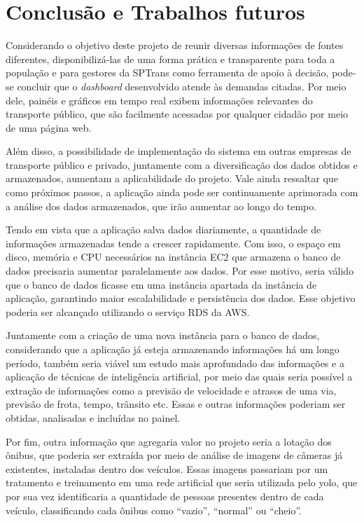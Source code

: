\chapter{Conclusão e Trabalhos futuros}
\label{Cap:Conclusoes}
\indent
\par Considerando o objetivo deste projeto de reunir diversas informações de fontes diferentes, disponibilizá-las de uma forma prática e transparente para toda a população e para gestores da SPTrans como ferramenta de apoio à decisão, pode-se concluir que o \textit{dashboard} desenvolvido atende às demandas citadas. Por meio dele, painéis e gráficos em tempo real exibem informações relevantes do transporte público, que são facilmente acessadas por qualquer cidadão por meio de uma página web.
\indent
\par Além disso, a possibilidade de implementação do sistema em outras empresas de transporte público e privado, juntamente com a diversificação dos dados obtidos e armazenados, aumentam a aplicabilidade do projeto. Vale ainda ressaltar que como próximos passos, a aplicação ainda pode ser continuamente aprimorada com a análise dos dados armazenados, que irão aumentar ao longo do tempo.
\indent
\par Tendo em vista que a aplicação salva dados diariamente, a quantidade de informações armazenadas tende a crescer rapidamente. Com isso, o espaço em disco, memória e CPU necessários na instância EC2 que armazena o banco de dados precisaria aumentar paralelamente aos dados. Por esse motivo, seria válido que o banco de dados ficasse em uma instância apartada da instância de aplicação, garantindo maior escalabilidade e persistência dos dados. Esse objetivo poderia ser alcançado utilizando o serviço RDS da AWS.
\indent
\par Juntamente com a criação de uma nova instância para o banco de dados, considerando que a aplicação já esteja armazenando informações há um longo período, também seria viável um estudo mais aprofundado das informações e a aplicação de técnicas de inteligência artificial, por meio das quais seria possível a extração de informações como a previsão de velocidade e atrasos de uma via, previsão de frota, tempo, trânsito etc. Essas e outras informações poderiam ser obtidas, analisadas e incluídas no painel.
\indent
\par Por fim, outra informação que agregaria valor no projeto seria a lotação dos ônibus, que poderia ser extraída por meio de análise de imagens de câmeras já existentes, instaladas dentro dos veículos. Essas imagens passariam por um tratamento e treinamento em uma rede artificial que seria utilizada pelo yolo, que por sua vez identificaria a quantidade de pessoas presentes dentro de cada veículo, classificando cada ônibus como “vazio”, “normal” ou “cheio”.




